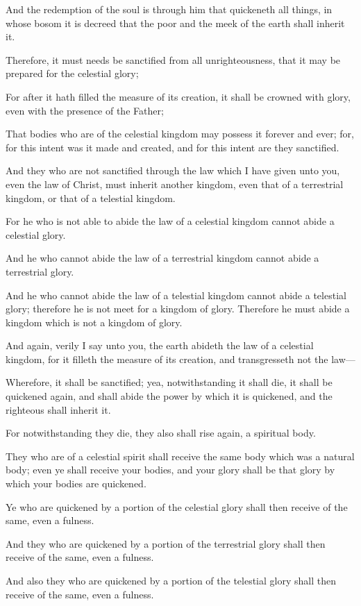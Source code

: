 And the redemption of the soul is through him that quickeneth all things, in whose bosom it
is decreed that the poor and the meek of the earth shall inherit it.

Therefore, it must needs be sanctified from all unrighteousness, that it may be prepared for
the celestial glory;

For after it hath filled the measure of its creation, it shall be crowned with glory, even with
the presence of the Father;

That bodies who are of the celestial kingdom may possess it forever and ever; for, for this
intent was it made and created, and for this intent are they sanctified.

And they who are not sanctified through the law which I have given unto you, even the law
of Christ, must inherit another kingdom, even that of a terrestrial kingdom, or that of a
telestial kingdom.

For he who is not able to abide the law of a celestial kingdom cannot abide a celestial glory.

And he who cannot abide the law of a terrestrial kingdom cannot abide a terrestrial glory.

And he who cannot abide the law of a telestial kingdom cannot abide a telestial glory;
therefore he is not meet for a kingdom of glory. Therefore he must abide a kingdom which is
not a kingdom of glory.

And again, verily I say unto you, the earth abideth the law of a celestial kingdom, for it filleth
the measure of its creation, and transgresseth not the law—

Wherefore, it shall be sanctified; yea, notwithstanding it shall die, it shall be quickened again,
and shall abide the power by which it is quickened, and the righteous shall inherit it.

For notwithstanding they die, they also shall rise again, a spiritual body.

They who are of a celestial spirit shall receive the same body which was a natural body; even
ye shall receive your bodies, and your glory shall be that glory by which your bodies are
quickened.

Ye who are quickened by a portion of the celestial glory shall then receive of the same, even
a fulness.

And they who are quickened by a portion of the terrestrial glory shall then receive of the
same, even a fulness.

And also they who are quickened by a portion of the telestial glory shall then receive of the
same, even a fulness.

